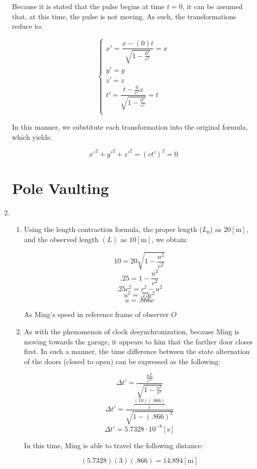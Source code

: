 \begin{enumerate}
        Because it is stated that the pulse begins at time $t=0$, it can be assumed that, at this time, the pulse is not moving. As such, the transformations reduce to:

        $$\left\{\begin{array}{l}x'=\dfrac{x-(0)t}{\sqrt{1-\frac{0^2}{c^2}}}=x\\y'=y\\z'=z\\t'=\dfrac{t-\frac{0}{c^2}x}{\sqrt{1-\frac{0^2}{c^2}}}=t\\ \end{array}$$

          In this manner, we substitute each transformation into the original formula, which yields:

          $$\boxed{x'^2+y'^2+z'^2=(ct')^2=0}$$

    \section{Pole Vaulting}

  \item

    \begin{enumerate}

      \item Using the length contraction formula, the proper length ($L_0$) as $20[\si{\meter}]$, and the observed length $(L)$ as $10[\si{\meter}]$, we obtain:

        $$10 = 20\sqrt{1-\dfrac{u^2}{c^2}}$$
        $$.25=1-\dfrac{u^2}{c^2}$$
        $$.25c^2=c^2-u^2$$
        $$u^2=.75c^2$$
        $$\boxed{u=.866c}$$

        As Ming's speed in reference frame of observer $O$

      \item As with the phenomenon of clock desynchronization, because Ming is moving towards the garage, it appears to him that the farther door closes first. In such a manner, the time difference between the state alternation of the doors (closed to open) can be expressed as the following:

        $$\Delta t'=\dfrac{\frac{uL}{c^2}}{\sqrt{1-\frac{u^2}{c^2}}}$$
        $$\Delta t'= \frac{\frac{(10)(.866)}{c}}{\sqrt{1-(.866)^2}}$$
        $$\Delta t'= 5.7328\cdot10^{-8}[\si{\second}]$$

        In this time, Ming is able to travel the following distance:

        $$(5.7328)(3)(.866)=14.894[\si{\meter}]$$


\end{enumerate}
\end{enumerate}
